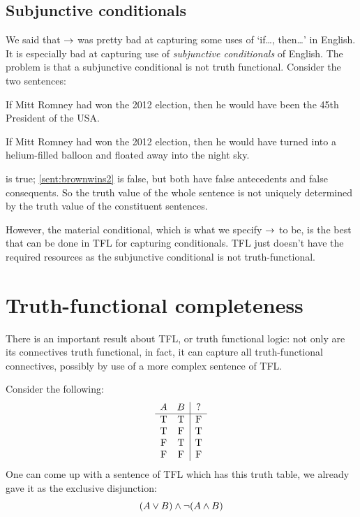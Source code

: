 \subsection{Subjunctive conditionals}\label{sec:IndicativeSubjunctive}



We said that $\rightarrow$ was pretty bad at capturing some uses of `if\ldots, then\ldots' in English. It is especially bad at capturing use of \emph{subjunctive conditionals} of English. The problem is that a subjunctive conditional is not truth functional.
Consider the two sentences:
\begin{samplesent}
	\item\label{sent:brownwins1} If Mitt Romney had won the 2012 election, then he would have been the 45th President of the USA.
	\item\label{sent:brownwins2} If Mitt Romney had won the 2012 election, then he would have turned into a helium-filled balloon and floated away into the night sky.
\end{samplesent}
 is true; \cref{sent:brownwins2} is false, but both have false antecedents and false consequents. So the truth value of the whole sentence is not uniquely determined by the truth value of the constituent sentences.

However, the material conditional, which is what we specify $\rightarrow$ to be, is the best that can be done in TFL for capturing conditionals. TFL just doesn't have the required resources as the subjunctive conditional is not truth-functional.

\section{Truth-functional completeness}
There is an important result about TFL, or truth functional logic: not only are its connectives truth functional, in fact, it can capture all truth-functional connectives, possibly by use of a more complex sentence of TFL. 

Consider the following:
\[\begin{array}{cc|c}
	A&B&?\\\hline
	\textrm{T}&\textrm{T}&\textrm{F}\\
	\textrm{T}&\textrm{F}&\textrm{T}\\
	\textrm{F}&\textrm{T}&\textrm{T}\\
	\textrm{F}&\textrm{F}&\textrm{F}
\end{array}\]
One can come up with a sentence of TFL which has this truth table, we already gave it as the exclusive disjunction:\[(A\vee B)\mathbin{\wedge}\neg (A\mathbin{\wedge} B)\]

